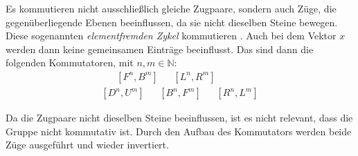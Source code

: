 \documentclass[12pt,a4paper, usenames, dvipsnames]{article}
\theoremstyle{mystyle}
\theoremstyle{definition}
\begin{document}
Es kommutieren nicht ausschließlich gleiche Zugpaare, sondern auch Züge, die gegenüberliegende Ebenen beeinflussen, da sie nicht dieselben Steine bewegen. Diese sogenannten \textit{elementfremden Zykel} kommutieren \cite{OS}. Auch bei dem Vektor $x$ werden dann keine gemeinsamen Einträge beeinflusst.
Das sind dann die folgenden Kommutatoren, mit $n, m \in \mathbb{N}$:
\begin{align*}
[U^n, D^m] \ \ \ \  \ \ \ [F^n, B^m] \ \ \ \ \ \ \ [L^n, R^m] \\
[D^n, U^m] \ \ \ \ \ \ \  [B^n, F^m] \ \ \ \ \ \ \ [R^n, L^m] 
\end{align*}

Da die Zugpaare nicht dieselben Steine beeinflussen, ist es nicht relevant, dass die Gruppe nicht kommutativ ist. Durch den Aufbau des Kommutators werden beide Züge ausgeführt und wieder invertiert.
\end{document}

